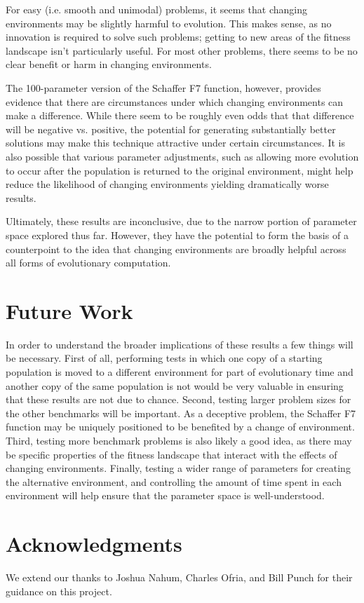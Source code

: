 \documentclass{sig-alternate}
\begin{document}
For easy (i.e. smooth and unimodal) problems, it seems that changing environments may be slightly harmful to evolution. This makes sense, as no innovation is required to solve such problems; getting to new areas of the fitness landscape isn't particularly useful. For most other problems, there seems to be no clear benefit or harm in changing environments.

The 100-parameter version of the Schaffer F7 function, however, provides evidence that there are circumstances under which changing environments can make a difference. While there seem to be roughly even odds that that difference will be negative vs. positive, the potential for generating substantially better solutions may make this technique attractive under certain circumstances. It is also possible that various parameter adjustments, such as allowing more evolution to occur after the population is returned to the original environment, might help reduce the likelihood of changing environments yielding dramatically worse results. 

Ultimately, these results are inconclusive, due to the narrow portion of parameter space explored thus far. However, they have the potential to form the basis of a counterpoint to the idea that changing environments are broadly helpful across all forms of evolutionary computation.

\section{Future Work}
In order to understand the broader implications of these results a few things will be necessary. First of all, performing tests in which one copy of a starting population is moved to a different environment for part of evolutionary time and another copy of the same population is not would be very valuable in ensuring that these results are not due to chance. Second, testing larger problem sizes for the other benchmarks will be important. As a deceptive problem, the Schaffer F7 function may be uniquely positioned to be benefited by a change of environment. Third, testing more benchmark problems is also likely a good idea, as there may be specific properties of the fitness landscape that interact with the effects of changing environments. Finally, testing a wider range of parameters for creating the alternative environment, and controlling the amount of time spent in each environment will help ensure that the parameter space is well-understood.

\section{Acknowledgments}
We extend our thanks to Joshua Nahum, Charles Ofria, and Bill Punch for their guidance on this project.
\end{document}
